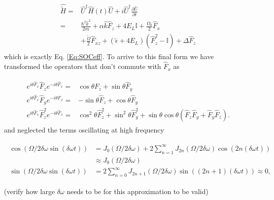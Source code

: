 \begin{align}
	\begin{split}
		\hat{\tilde{H}} = & \hat{U}^{\dagger}\hat{H}(t)\hat{U} + i\hat{U}^{\dagger} \frac{\partial\hat{U}}{\partial t} \\
		 = &\frac{\hbar^2\hat{k}^2}{2m} + \alpha\hat{k}\hat{F}_z +4E_L\mathbb{I} + \frac{\Omega_0}{2}\hat{F}_x \\
		&+ \frac{\tilde{\Omega}}{2}\hat{F}_{xz} +(\tilde{\epsilon}+4E_L)(\hat{F}_z^2-\mathbb{I}) +\Delta\hat{F}_z 	
	\end{split}
\end{align}
%
%
which is exactly Eq. \ref{Eq:SOCeff}. To arrive to this final form we have transformed the operators that don't commute with $\hat{F}_x$ as

%
\begin{align}
	\begin{split}
		e^{i\theta \hat{F}_x} \hat{F}_z e^{-i\theta \hat{F}_x}=& \cos\theta \hat{F}_z + \sin\theta\hat{F}_y \\
		e^{i\theta \hat{F}_x} \hat{F}_y e^{-i\theta \hat{F}_x} =& -\sin\theta\hat{F}_z +\cos\theta\hat{F}_y \\
		e^{i\theta \hat{F}_x} \hat{F}_z^2 e^{-i\theta \hat{F}_x} = &\cos^2\theta\hat{F}_z^2+\sin^2\theta\hat{F}_y^2 + \sin\theta\cos\theta(\hat{F}_z\hat{F}_y + \hat{F}_y\hat{F}_z).
	\end{split}
\end{align}
%
and neglected the terms oscillating at high frequency

\begin{align}
	\begin{split}
	\cos(\Omega/2\delta\omega\sin(\delta\omega t))&= J_0(\Omega/2\delta\omega) + 2\sum_{n=1}^{\infty}J_{2n}(\Omega/2\delta\omega)\cos(2n(\delta\omega t)) \\
	& \approx J_0(\Omega/2\delta\omega) \\
	\sin(\Omega/2\delta\omega\sin(\delta\omega t))&= 2\sum_{n=0}^{\infty}J_{2n+1}(\Omega/2\delta\omega)\sin((2n+1)(\delta\omega t)) \approx 0,
	\end{split}
\end{align} 


(verify how large $\delta\omega$ needs to be for this approximation to be valid)
%
%
 





